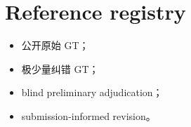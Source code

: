 \section{Reference registry}

\begin{itemize}
  \item 公开原始 GT；
  \item 极少量纠错 GT；
  \item blind preliminary adjudication；
  \item submission-informed revision。
\end{itemize}
